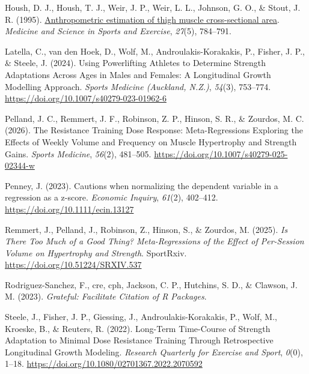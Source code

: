 \documentclass[
]{article}
\newlength{\cslhangindent}
\newenvironment{CSLReferences}[2] %
 {\begin{list}{}{%
  \setlength{\itemindent}{0pt}
  \setlength{\leftmargin}{0pt}
  \setlength{\parsep}{0pt}
  \ifodd #1
   \setlength{\leftmargin}{\cslhangindent}
   \setlength{\itemindent}{-1\cslhangindent}
  \fi
  \setlength{\itemsep}{#2\baselineskip}}}
 {\end{list}}
\begin{document}
\begin{CSLReferences}{1}{0}
Housh, D. J., Housh, T. J., Weir, J. P., Weir, L. L., Johnson, G. O., \&
Stout, J. R. (1995).
\href{https://www.ncbi.nlm.nih.gov/pubmed/7674885}{Anthropometric
estimation of thigh muscle cross-sectional area}. \emph{Medicine and
Science in Sports and Exercise}, \emph{27}(5), 784--791.

Latella, C., van den Hoek, D., Wolf, M., Androulakis-Korakakis, P.,
Fisher, J. P., \& Steele, J. (2024). Using {Powerlifting Athletes} to
{Determine Strength Adaptations Across Ages} in {Males} and {Females}:
{A Longitudinal Growth Modelling Approach}. \emph{Sports Medicine
(Auckland, N.Z.)}, \emph{54}(3), 753--774.
\url{https://doi.org/10.1007/s40279-023-01962-6}

Pelland, J. C., Remmert, J. F., Robinson, Z. P., Hinson, S. R., \&
Zourdos, M. C. (2026). The {Resistance Training Dose Response}:
{Meta-Regressions Exploring} the {Effects} of {Weekly Volume} and
{Frequency} on {Muscle Hypertrophy} and {Strength Gains}. \emph{Sports
Medicine}, \emph{56}(2), 481--505.
\url{https://doi.org/10.1007/s40279-025-02344-w}

Penney, J. (2023). Cautions when normalizing the dependent variable in a
regression as a z-score. \emph{Economic Inquiry}, \emph{61}(2),
402--412. \url{https://doi.org/10.1111/ecin.13127}

Remmert, J., Pelland, J., Robinson, Z., Hinson, S., \& Zourdos, M.
(2025). \emph{Is {There Too Much} of a {Good Thing}? {Meta-Regressions}
of the {Effect} of {Per-Session Volume} on {Hypertrophy} and
{Strength}}. SportRxiv. \url{https://doi.org/10.51224/SRXIV.537}

Rodriguez-Sanchez, F., cre, cph, Jackson, C. P., Hutchins, S. D., \&
Clawson, J. M. (2023). \emph{Grateful: {Facilitate Citation} of {R
Packages}}.

Steele, J., Fisher, J. P., Giessing, J., Androulakis-Korakakis, P.,
Wolf, M., Kroeske, B., \& Reuters, R. (2022). Long-{Term Time-Course} of
{Strength Adaptation} to {Minimal Dose Resistance Training Through
Retrospective Longitudinal Growth Modeling}. \emph{Research Quarterly
for Exercise and Sport}, \emph{0}(0), 1--18.
\url{https://doi.org/10.1080/02701367.2022.2070592}


\end{CSLReferences}
\end{document}
